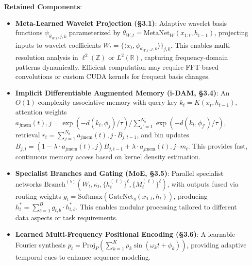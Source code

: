 \documentclass{article}
\begin{document}
\textbf{Retained Components}:
\begin{itemize}
    \item \textbf{Meta-Learned Wavelet Projection (\S3.1)}: Adaptive wavelet basis functions $\psi_{\theta_{W,t},j,k}$ parameterized by $\theta_{W,t} = \text{MetaNet}_W(x_{1:t}, h_{t-1})$, projecting inputs to wavelet coefficients $W_t = \{\langle x_t, \psi_{\theta_{W,t},j,k} \rangle\}_{j,k}$. This enables multi-resolution analysis in $\ell^2(\mathbb{Z})$ or $L^2(\mathbb{R})$, capturing frequency-domain patterns dynamically. Efficient computation may require FFT-based convolutions or custom CUDA kernels for frequent basis changes.
    \item \textbf{Implicit Differentiable Augmented Memory (i-DAM, \S3.4)}: An $O(1)$-complexity associative memory with query key $k_t = K(x_t, h_{t-1})$, attention weights $a_{j\text{mem}}(t),j = \exp(-d(k_t, \phi_j)/\tau) / \sum_{j'=1}^{N_b} \exp(-d(k_t, \phi_{j'})/\tau)$, retrieval $r_t = \sum_{j=1}^{N_b} a_{j\text{mem}}(t),j \cdot B_{j,t-1}$, and bin updates $B_{j,t} = (1 - \lambda \cdot a_{j\text{mem}}(t),j) B_{j,t-1} + \lambda \cdot a_{j\text{mem}}(t),j \cdot m_t$. This provides fast, continuous memory access based on kernel density estimation.
    \item \textbf{Specialist Branches and Gating (MoE, \S3.5)}: Parallel specialist networks $\text{Branch}^{(b)}(W_t, \kappa_t, \{h_t^{(\ell)}\}^\ell, \{M_t^{(\ell)}\}^\ell)$, with outputs fused via routing weights $g_t = \text{Softmax}(\text{GateNet}_g(x_{1:t}, h_t))$, producing $h^*_t = \sum_{b=1}^B g_{t,b} \cdot h^*_{t,b}$. This enables modular processing tailored to different data aspects or task requirements.
    \item \textbf{Learned Multi-Frequency Positional Encoding (\S3.6)}: A learnable Fourier synthesis $p_t = \text{Proj}_P\left( \sum_{k=1}^K \rho_k \sin(\omega_k t + \phi_k) \right)$, providing adaptive temporal cues to enhance sequence modeling.
\end{itemize}
\end{document}
